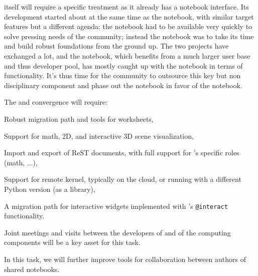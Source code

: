 \begin{workpackage}
\begin{tasklist}
\begin{task}[title=Uniform notebook interface for all interactive components,id=ipython-kernels]

  \Sage itself will require a specific treatment as it already has a
  notebook interface. Its development started about at the same time
  as the \Jupyter notebook, with similar target features but a
  different agenda: the \Sage notebook had to be available very quickly
  to solve pressing needs of the \Sage community; instead the \Jupyter
  notebook was to take its time and build robust foundations from the
  ground up. The two projects have exchanged a lot, and the \Jupyter
  notebook, which benefits from a much larger user base and thus
  developer pool, has mostly caught up with the \Sage notebook in terms
  of functionality. It's thus time for the \Sage community to outsource
  this key but non disciplinary component and phase out the \Sage
  notebook in favor of the \Jupyter notebook.

  The \Sage and \Jupyter convergence  will
  require:
  \begin{compactitem}
  \item Robust migration path and tools for \Sage worksheets,
  \item Support for math, 2D, and interactive 3D scene visualization,
  \item Import and export of ReST documents, with full support for
    \Sage's specific roles (math, ...),
  \item Support for remote \Sage kernel, typically on the cloud, or
    running with a different Python version (\Sage as a library),
  \item A migration path for interactive widgets implemented with
    \Sage's \texttt{@interact} functionality.
  \end{compactitem}

  Joint meetings and visits between the developers of \Jupyter and of
  the computing components will be a key asset for this task.

\end{task}

\begin{task}[id=notebook-collab,title=Notebook improvements for collaboration]
  In this task, we will further improve tools for collaboration between
  authors of shared \Jupyter notebooks.


\end{task}
\end{tasklist}
\end{workpackage}
